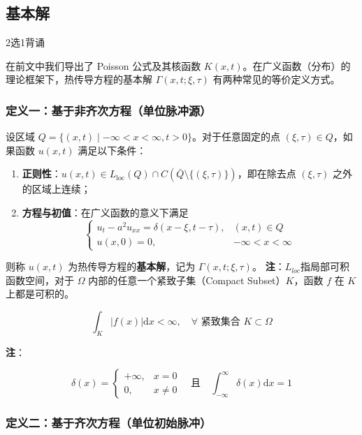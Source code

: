 \documentclass[12pt,a4paper]{ctexart}
\begin{document}
	\subsection{基本解}
	
	2选1背诵
	
	在前文中我们导出了 Poisson 公式及其核函数 $K(x,t)$。在广义函数（分布）的理论框架下，热传导方程的基本解 $\Gamma(x,t; \xi, \tau)$ 有两种常见的等价定义方式。
	
	\subsubsection{定义一：基于非齐次方程（单位脉冲源）}
	
	设区域 $Q = \{(x,t) \mid -\infty < x < \infty, t > 0\}$。对于任意固定的点 $(\xi, \tau) \in Q$，如果函数 $u(x,t)$ 满足以下条件：
	\begin{enumerate}
		\item \textbf{正则性}：$u(x,t) \in L_{\text{loc}}(Q) \cap C(\bar{Q} \setminus \{(\xi, \tau)\})$，即在除去点 $(\xi, \tau)$ 之外的区域上连续；
		\item \textbf{方程与初值}：在广义函数的意义下满足
		\begin{equation*}
			\begin{cases}
				u_t - a^2 u_{xx} = \delta(x-\xi, t-\tau), & (x,t) \in Q \\
				u(x,0) = 0, & -\infty < x < \infty
			\end{cases}
		\end{equation*}
	\end{enumerate}
	则称 $u(x,t)$ 为热传导方程的\textbf{基本解}，记为 $\Gamma(x,t; \xi, \tau)$。
	\newline
	\textbf{注}：$L_{loc}$指局部可积函数空间，对于 $\Omega$ 内部的任意一个紧致子集（Compact Subset）$K$，函数 $f$ 在 $K$ 上都是可积的。
	
	$$\int_K |f(x)| \mathrm{d}x < \infty, \quad \forall \text{ 紧致集合 } K \subset \Omega$$

	\textbf{注}：
	
	$$\delta(x) = \begin{cases} 
		+\infty, & x = 0 \\
		0, & x \neq 0
	\end{cases}
	\quad \text{且} \quad \int_{-\infty}^{\infty} \delta(x) \mathrm{d}x = 1$$
	
	\subsubsection{定义二：基于齐次方程（单位初始脉冲）}
	
\end{document}
